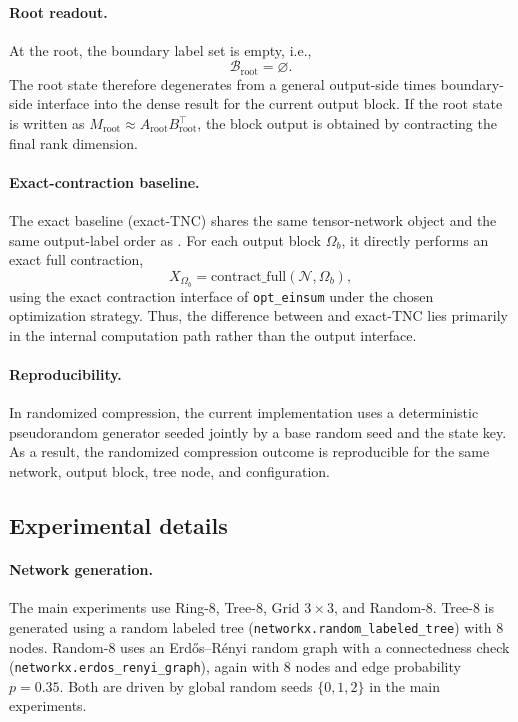 \paragraph{Root readout.}
At the root, the boundary label set is empty, i.e.,
\[
\mathcal B_{\mathrm{root}}=\varnothing.
\]
The root state therefore degenerates from a general output-side times boundary-side interface into the dense result for the current output block. If the root state is written as $M_{\mathrm{root}} \approx A_{\mathrm{root}} B_{\mathrm{root}}^\top$, the block output is obtained by contracting the final rank dimension.

\paragraph{Exact-contraction baseline.}
The exact baseline (\textsf{exact-TNC}) shares the same tensor-network object and the same output-label order as \method{}. For each output block $\Omega_b$, it directly performs an exact full contraction,
\[
X_{\Omega_b} = \mathrm{contract\_full}(\mathcal N,\Omega_b),
\]
using the exact contraction interface of \texttt{opt\_einsum} under the chosen optimization strategy. Thus, the difference between \method{} and \textsf{exact-TNC} lies primarily in the internal computation path rather than the output interface.

\paragraph{Reproducibility.}
In randomized compression, the current implementation uses a deterministic pseudorandom generator seeded jointly by a base random seed and the state key. As a result, the randomized compression outcome is reproducible for the same network, output block, tree node, and configuration.

\subsection{Experimental details}
\label{app:exp-details}

\paragraph{Network generation.}
The main experiments use Ring-8, Tree-8, Grid $3\times 3$, and Random-8. Tree-8 is generated using a random labeled tree (\texttt{networkx.random\_labeled\_tree}) with $8$ nodes. Random-8 uses an Erd\H{o}s--R\'enyi random graph with a connectedness check (\texttt{networkx.erdos\_renyi\_graph}), again with $8$ nodes and edge probability $p=0.35$. Both are driven by global random seeds $\{0,1,2\}$ in the main experiments.

